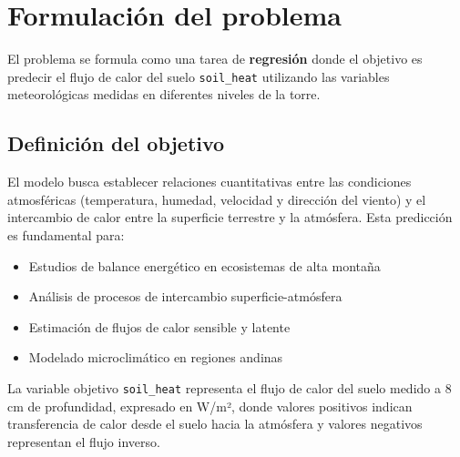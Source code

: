 %

\section{Formulación del problema}

El problema se formula como una tarea de \textbf{regresión} donde el objetivo es
predecir el flujo de calor del suelo \verb!soil_heat! utilizando las variables
meteorológicas medidas en diferentes niveles de la torre.

\subsection{Definición del objetivo}
El modelo busca establecer relaciones cuantitativas entre las condiciones
atmosféricas (temperatura, humedad, velocidad y dirección del viento) y el
intercambio de calor entre la superficie terrestre y la atmósfera. Esta
predicción es fundamental para:

\begin{itemize}
    \item Estudios de balance energético en ecosistemas de alta montaña
    \item Análisis de procesos de intercambio superficie-atmósfera
    \item Estimación de flujos de calor sensible y latente
    \item Modelado microclimático en regiones andinas
\end{itemize}

La variable objetivo \verb!soil_heat! representa el flujo de calor del suelo medido
a 8 cm de profundidad, expresado en W/m², donde valores positivos indican
transferencia de calor desde el suelo hacia la atmósfera y valores negativos
representan el flujo inverso.

